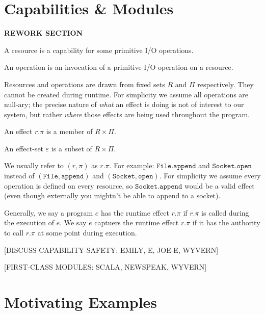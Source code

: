 \documentclass[a4paper,UKenglish]{lipics-v2016}
\newcommand{\kwa}[1]{\mathtt{ #1 }}
\begin{document}
\section{Capabilities \& Modules}

\textbf{REWORK SECTION}

\begin{definition}
A resource is a capability for some primitive I/O operations.
\end{definition}

\begin{definition}
An operation is an invocation of a primitive I/O operation on a resource.
\end{definition}

\noindent
Resources and operations are drawn from fixed sets $R$ and $\Pi$ respectively. They cannot be created during runtime. For simplicity we assume all operations are null-ary; the precise nature of \textit{what} an effect is doing is not of interest to our system, but rather \textit{where} those effects are being used throughout the program.

\begin{definition}
An effect $r.\pi$ is a member of $R \times \Pi$.
\end{definition}

\begin{definition}
An effect-set $\varepsilon$ is a subset of $R \times \Pi$.
\end{definition}

\noindent
We usually refer to $(r, \pi)$ as $r.\pi$. For example: $\kwa{File.append}$ and $\kwa{Socket.open}$ instead of $\kwa{(File, append)}$ and $\kwa{(Socket, open)}$. For simplicity we assume every operation is defined on every resource, so $\kwa{Socket.append}$ would be a valid effect (even though externally you mightn't be able to append to a socket).

Generally, we say a program $e$ has the runtime effect $r.\pi$ if $r.\pi$ is called during the execution of $e$. We say $e$ captuers the runtime effect $r.\pi$ if it has the authority to call $r.\pi$ at some point during execution.

[DISCUSS CAPABILITY-SAFETY: EMILY, E, JOE-E, WYVERN]

[FIRST-CLASS MODULES: SCALA, NEWSPEAK, WYVERN]

\section{Motivating Examples}
\end{document}
